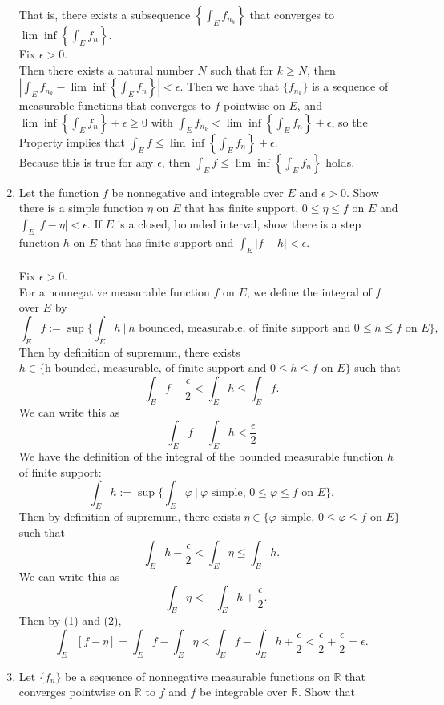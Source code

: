 \begin{enumerate}
    That is, there exists a subsequence $\left\{\int_Ef_{n_k}\right\}$ that converges to $\lim\inf\left\{\int_Ef_n\right\}$.
    \\Fix $\epsilon>0$.
    \\Then there exists a natural number $N$ such that for $k\ge N$, then $\left|\int_Ef_{n_k}-\lim\inf\left\{\int_Ef_n\right\}\right|<\epsilon$.
    Then we have that $\{f_{n_k}\}$ is a sequence of measurable functions that converges to $f$ pointwise on $E$, and $\lim\inf\left\{\int_Ef_n\right\}+\epsilon\ge0$ with $\int_Ef_{n_k}<\lim\inf\left\{\int_Ef_n\right\}+\epsilon$,
    so the Property implies that $\int_E f\le\lim\inf\left\{\int_Ef_n\right\}+\epsilon$.
    \\Because this is true for any $\epsilon$, then $\int_E f\le\lim\inf\left\{\int_Ef_n\right\}$ holds.
    \item Let the function $f$ be nonnegative and integrable over $E$ and $\epsilon>0$. Show there is a simple function $\eta$ on $E$ that has finite support, $0\le\eta\le f$ on $E$ and $\int_E|f-\eta|<\epsilon$.
    If $E$ is a closed, bounded interval, show there is a step function $h$ on $E$ that has finite support and $\int_E|f-h|<\epsilon$.\\
    \\Fix $\epsilon>0$.
    \\For a nonnegative measurable function $f$ on $E$, we define the integral of $f$ over $E$ by
    \[
        \int_Ef:=\sup\biggl\{\int_Eh\ |\ h\text{ bounded, measurable, of finite support and }0\le h\le f\text{ on }E\biggr\},
    \]
    Then by definition of supremum, there exists $h\in\{ \text{h bounded, measurable, of finite support and }0\le h\le f\text{ on }E\}$ such that
    \[
        \int_Ef-\frac{\epsilon}{2}<\int_Eh\le\int_Ef.
    \]
    We can write this as
    \[
        \int_Ef-\int_Eh<\frac{\epsilon}{2}\tag{1}
    \]
    We have the definition of the integral of the bounded measurable function $h$ of finite support:
    \[
        \int_Eh:=\sup\biggl\{\int_E\varphi\ |\ \varphi\text{ simple, }0\le\varphi\le f\text{ on }E\biggr\}.
    \]
    Then by definition of supremum, there exists $\eta\in\{ \varphi\text{ simple, }0\le\varphi\le f\text{ on }E\}$ such that
    \[
        \int_Eh-\frac{\epsilon}{2}<\int_E\eta\le\int_Eh.
    \]
    We can write this as
    \[
        -\int_E\eta<-\int_Eh+\frac{\epsilon}{2}.\tag{2}
    \]
    Then by (1) and (2),
    \[
        \int_E[f-\eta]=\int_Ef-\int_E\eta<\int_Ef-\int_Eh+\frac{\epsilon}{2}<\frac{\epsilon}{2}+\frac{\epsilon}{2}=\epsilon.
    \]
    \item Let $\{f_n\}$ be a sequence of nonnegative measurable functions on $\mathbb{R}$ that converges pointwise on $\mathbb{R}$ to $f$ and $f$ be integrable over $\mathbb{R}$. Show that

\end{enumerate}
